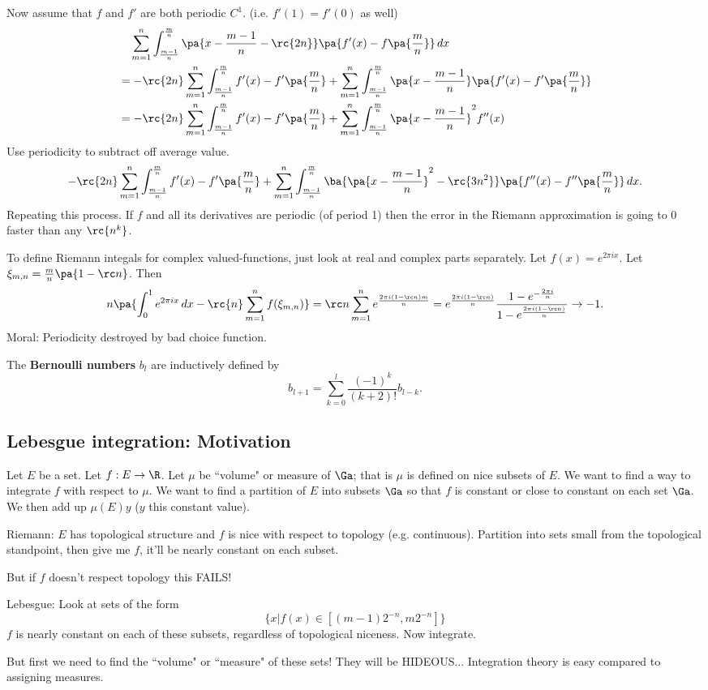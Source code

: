 Now assume that $f$ and $f'$ are both periodic $C^1$. (i.e. $f'(1)=f'(0)$ as well)
\begin{align*}
&\quad \sum_{m=1}^n\int_{\frac{m-1}{n}}^{\frac mn} \pa{x-\frac{m-1}{n}-\rc{2n}}\pa{f'(x)-f\pa{\frac mn}}\,dx\\
&=-\rc{2n}\sum_{m=1}^n \int_{\frac{m-1}{n}}^{\frac mn}f'(x)-f'\pa{\frac mn}+\sum_{m=1}^n \int_{\frac{m-1}{n}}^{\frac mn} \pa{x-\frac{m-1}{n}}\pa{f'(x)-f'\pa{\frac mn}}\\
&=-\rc{2n}\sum_{m=1}^n \int_{\frac{m-1}{n}}^{\frac mn}f'(x)-f'\pa{\frac mn}+\sum_{m=1}^n \int_{\frac{m-1}{n}}^{\frac mn} \pa{x-\frac{m-1}{n}}^2f''(x)
\end{align*}
Use periodicity to subtract off average value.
\[
-\rc{2n}\sum_{m=1}^n \int_{\frac{m-1}{n}}^{\frac mn}f'(x)-f'\pa{\frac mn}+\sum_{m=1}^n \int_{\frac{m-1}{n}}^{\frac mn} \ba{\pa{x-\frac{m-1}{n}}^2-\rc{3n^2}}\pa{f''(x)-f''\pa{\frac mn}}\,dx.
\]
Repeating this process. If $f$ and all its derivatives are periodic (of period 1) then the error in the Riemann approximation is going to 0 
faster than any $\rc{n^k}$.

To define Riemann integals for complex valued-functions, just look at real and complex parts separately. Let $f(x)=e^{2\pi ix}$.
Let $\xi_{m,n}=\frac mn\pa{1-\rc n}$. Then
\[
n\pa{\int_0^1 e^{2\pi i x}\,dx-
\rc{n}\sum_{m=1}^n f(\xi_{m,n})}=
\rc n\sum_{m=1}^n e^{\frac{2\pi i(1-\rc n)m}{n}}
=e^{\frac{2\pi i(1-\rc n)}{n}}\frac{1-e^{-\frac{2\pi i}{n}}}{1-e^{\frac{2\pi i(1-\rc n)}{n}}}\to -1
.\]
Moral: Periodicity destroyed by bad choice function.

\begin{df}
The \textbf{Bernoulli numbers} $b_l$ are inductively defined by
\[
b_{l+1}=\sum_{k=0}^l \frac{(-1)^k}{(k+2)!}b_{l-k}.
\]
\end{df}
\subsection{Lebesgue integration: Motivation}

Let $E$ be a set. Let $f:E\to \R$.
Let $\mu$ be ``volume" or measure of $\Ga$; that is $\mu$ is defined on nice subsets of $E$. We want to find a way to integrate $f$ with respect to $\mu$. We want to find a partition of $E$ into subsets $\Ga$ so that $f$ is constant or close to constant on each set $\Ga$. We then add up $\mu(E)y$ ($y$ this constant value).

Riemann: $E$ has topological structure and $f$ is nice with respect to topology (e.g. continuous). Partition into sets small from the topological standpoint, then give me $f$, it'll be nearly constant on each subset.

But if $f$ doesn't respect topology this FAILS!

Lebesgue: Look at sets of the form
\[
\{x|f(x)\in[(m-1)2^{-n},m2^{-n}]\}
\]
$f$ is nearly constant on each of these subsets, regardless of topological niceness. Now integrate.

But first we need to find the ``volume" or ``measure" of these sets! They will be HIDEOUS... Integration theory is easy compared to assigning measures.